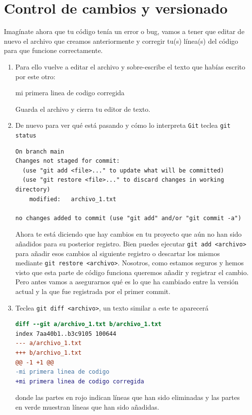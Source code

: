 \documentclass[a4paper,11pt]{report}
\newcommand{\cverb}{\Verb}
\begin{document}
  \section{Control de cambios y versionado}
    Imagínate ahora que tu código tenía un error o bug, vamos a tener que editar de nuevo el archivo que creamos anteriormente y corregir tu(s) línea(s) del código para que funcione correctamente. 
    
    \begin{enumerate}
    \item Para ello vuelve a editar el archivo y sobre-escribe el texto que habías escrito por este otro:
    \begin{cverbatim}
mi primera linea de codigo corregida
    \end{cverbatim}
    
    Guarda el archivo y cierra tu editor de texto.
      
    \item De nuevo para ver qué está pasando y cómo lo interpreta \verb+Git+ teclea \cverb+git status+
    
    \begin{lstlisting}[style=custom]
On branch main
Changes not staged for commit:
  (use "git add <file>..." to update what will be committed)
  (use "git restore <file>..." to discard changes in working directory)
	modified:   archivo_1.txt

no changes added to commit (use "git add" and/or "git commit -a")
    \end{lstlisting}
    
    Ahora te está diciendo que hay cambios en tu proyecto que aún no han sido añadidos para su posterior registro. Bien puedes ejecutar \cverb+git add <archivo>+ para añadir esos cambios al siguiente registro o descartar los mismos mediante \cverb+git restore <archivo>+. Nosotros, como estamos seguros y hemos visto que esta parte de código funciona queremos añadir y registrar el cambio. Pero antes vamos a asegurarnos qué es lo que ha cambiado entre la versión actual y la que fue registrada por el primer commit. 
    
    \item Teclea \cverb+git diff <archivo>+, un texto similar a este te aparecerá
    
    \begin{lstlisting}[style=custom, language=diff]
diff --git a/archivo_1.txt b/archivo_1.txt
index 7aa40b1..b3c9105 100644
--- a/archivo_1.txt
+++ b/archivo_1.txt
@@ -1 +1 @@
-mi primera linea de codigo
+mi primera linea de codigo corregida
    \end{lstlisting}
    donde las partes en rojo indican líneas que han sido eliminadas y las partes en verde muestran líneas que han sido añadidas.
    

\end{enumerate}
\end{document}
